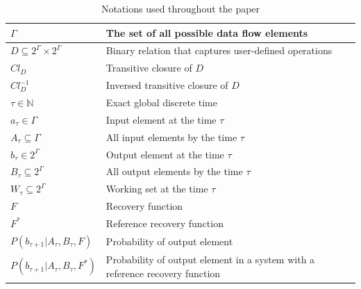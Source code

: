 \begin{table}[!b]
    \caption{Notations used throughout the paper}
    \begin{tabular}{l|p{5cm}}
        \hline
        $\Gamma$ & The set of all possible data flow elements \\ 
        \hline
        $D\subseteq{2^{\Gamma}\times2^{\Gamma}}$ & Binary relation that captures user-defined operations  \\
        \hline
        $Cl_D$ & Transitive closure of $D$  \\
        \hline
        $Cl^{-1}_D$ & Inversed transitive closure of $D$  \\
        \hline
        $\tau \in \mathbb{N}$ & Exact global discrete time \\
        \hline
        $a_\tau \in \Gamma$ & Input element at the time $\tau$ \\
        \hline
        $A_\tau \subseteq \Gamma$ & All input elements by the time $\tau$ \\
        \hline
        $b_\tau \in 2^{\Gamma}$ & Output element at the time $\tau$ \\
        \hline
        $B_\tau \subseteq 2^{\Gamma}$ & All output elements by the time $\tau$ \\
        \hline
        $W_\tau \subseteq 2^{\Gamma}$ & Working set at the time $\tau$ \\
        \hline
        $F$ & Recovery function \\
        \hline
        $F^{*}$ & Reference recovery function \\
        \hline
        $P(b_{\tau+1}|A_{\tau}, B_\tau, F)$ & Probability of output element \\
        \hline
        $P(b_{\tau+1}|A_{\tau}, B_\tau, F^{*})$ & Probability of output element in a system with a reference recovery function \\
    \end{tabular}
    \label{notations}
\end{table}


